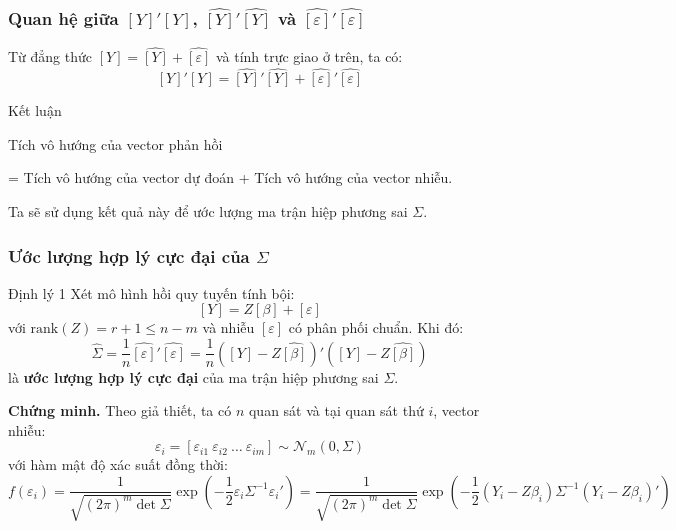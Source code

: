 \begin{frame}
\frametitle{Quan hệ giữa $[Y]'[Y]$, $\widehat{[Y]}'\widehat{[Y]}$ và $\widehat{[\varepsilon]}'\widehat{[\varepsilon]}$}
Từ đẳng thức $[Y] = \widehat{[Y]} + \widehat{[\varepsilon]}$ và tính trực giao ở trên, ta có:
\[
[Y]'[Y] = \widehat{[Y]}'\widehat{[Y]} + \widehat{[\varepsilon]}'\widehat{[\varepsilon]}
\]
\begin{block}{Kết luận}
\begin{center}
Tích vô hướng của vector phản hồi 

= Tích vô hướng của vector dự đoán + Tích vô hướng của vector nhiễu.
\end{center}
\end{block}
Ta sẽ sử dụng kết quả này để ước lượng ma trận hiệp phương sai $\Sigma$.
\end{frame}

\begin{frame}
\frametitle{Ước lượng hợp lý cực đại của $\Sigma$}

\begin{block}{Định lý 1}
Xét mô hình hồi quy tuyến tính bội:
\[
[Y] = Z[\beta] + [\varepsilon]
\]
với $\mathrm{rank}(Z)=r+1\le n-m$ và nhiễu $[\varepsilon]$ có phân phối chuẩn.  
Khi đó:
\[
\boxed{
\widehat{\Sigma} = \frac{1}{n}\widehat{[\varepsilon]}'\widehat{[\varepsilon]}
= \frac{1}{n}([Y] - Z\widehat{[\beta]})'([Y] - Z\widehat{[\beta]})
}
\]
là \textbf{ước lượng hợp lý cực đại} của ma trận hiệp phương sai $\Sigma$.
\end{block}
\textbf{Chứng minh.} Theo giả thiết, ta có $n$ quan sát và tại quan sát thứ $i$, vector nhiễu:
\[
\varepsilon_i = [\varepsilon_{i1} \ \varepsilon_{i2} \ \dots \ \varepsilon_{im}]
\sim \mathcal{N}_m(0, \Sigma)
\]
với hàm mật độ xác suất đồng thời:
{\tiny\[
f(\varepsilon_i)
= \frac{1}{\sqrt{(2\pi)^m \det \Sigma}}
\exp\!\left(-\frac{1}{2}\varepsilon_i \Sigma^{-1} \varepsilon_i'\right)
= \frac{1}{\sqrt{(2\pi)^m \det \Sigma}}
\exp\!\left(-\frac{1}{2}(Y_i - Z\beta_i)\Sigma^{-1}(Y_i - Z\beta_i)'\right)
\]}
\end{frame}

